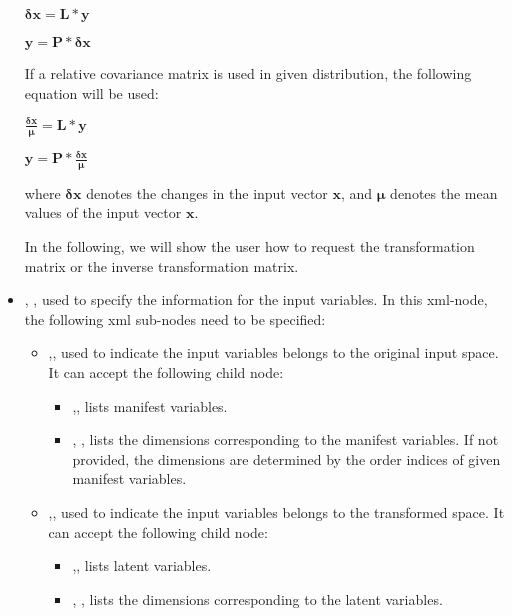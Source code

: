 \begin{itemize}
  $
  \mathbf{\delta x} = \mathbf L * \mathbf y
  $

  $
  \mathbf y = \mathbf P * \mathbf \delta \mathbf x
  $

  If a relative covariance matrix is used in given distribution, the following equation will be used:

  $
  \frac{\mathbf \delta \mathbf x}{\mathbf \mu} = \mathbf L * \mathbf y
  $

  $
  \mathbf y = \mathbf P * {\frac{\mathbf \delta \mathbf x}{\mathbf \mu}}
  $

  where $\mathbf{\delta x}$ denotes the changes in the input vector $\mathbf x$, and $\mathbf \mu$ denotes the mean values of the input vector $\mathbf x$.

  In the following, we will show the user how to request the transformation matrix or the inverse transformation matrix.
  \item {}, , used to specify the information for the input variables.
  In this xml-node, the following xml sub-nodes need to be specified:
    \begin{itemize}
      \item {},, used to indicate the input variables belongs to the original input space.
      It can accept the following child node:
        \begin{itemize}
          \item {},, lists manifest variables.
          \item {}, , lists the dimensions corresponding to the manifest variables.
          If not provided, the dimensions are determined by the order indices of given manifest variables.
        \end{itemize}
      \item {},, used to indicate the input variables belongs to the transformed space.
      It can accept the following child node:
        \begin{itemize}
          \item {},, lists latent variables.
          \item {}, , lists the dimensions corresponding to the latent variables.

\end{itemize}
\end{itemize}
\end{itemize}
